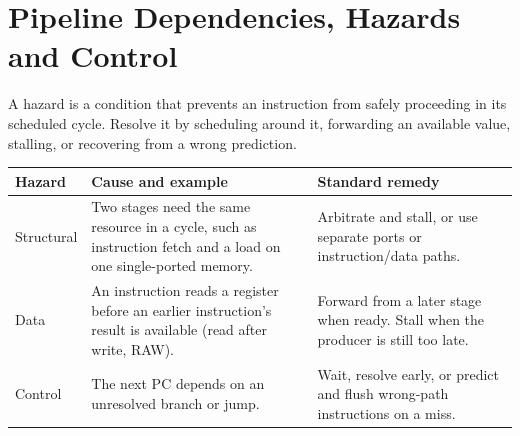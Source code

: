 \documentclass[12pt,a4paper]{article}
\begin{document}
\section{Pipeline Dependencies, Hazards and Control}
\begin{tcolorbox}[defbox,title={Pipeline hazard}]
A hazard is a condition that prevents an instruction from safely proceeding in its scheduled cycle. Resolve it by scheduling around it, forwarding an available value, stalling, or recovering from a wrong prediction.
\end{tcolorbox}
\par\vspace{6pt}\noindent
\begin{tabularx}{\linewidth}{|B{2.55cm}|Y|Y|}\hline
Hazard & Cause and example & Standard remedy \\ \hline
Structural & Two stages need the same resource in a cycle, such as instruction fetch and a load on one single-ported memory. & Arbitrate and stall, or use separate ports or instruction/data paths. \\ \hline
Data & An instruction reads a register before an earlier instruction's result is available (read after write, RAW). & Forward from a later stage when ready. Stall when the producer is still too late. \\ \hline
Control & The next PC depends on an unresolved branch or jump. & Wait, resolve early, or predict and flush wrong-path instructions on a miss. \\ \hline
\end{tabularx}
\end{document}
